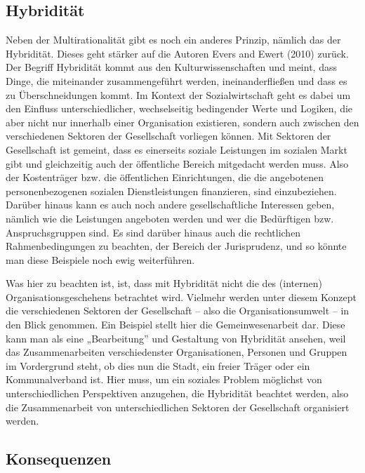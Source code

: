 \documentclass[
  letterpaper,
]{book}
\begin{document}
\subsection{Hybridität}\label{sozialwirtschat-hybriditaet}

Neben der Multirationalität gibt es noch ein anderes Prinzip, nämlich
das der Hybridität. Dieses geht stärker auf die Autoren Evers and Ewert
(2010) zurück. Der Begriff Hybridität kommt aus den Kulturwissenschaften
und meint, dass Dinge, die miteinander zusammengeführt werden,
ineinanderfließen und dass es zu Überschneidungen kommt. Im Kontext der
Sozialwirtschaft geht es dabei um den Einfluss unterschiedlicher,
wechselseitig bedingender Werte und Logiken, die aber nicht nur
innerhalb einer Organisation existieren, sondern auch zwischen den
verschiedenen Sektoren der Gesellschaft vorliegen können. Mit Sektoren
der Gesellschaft ist gemeint, dass es einerseits soziale Leistungen im
sozialen Markt gibt und gleichzeitig auch der öffentliche Bereich
mitgedacht werden muss. Also der Kostenträger bzw. die öffentlichen
Einrichtungen, die die angebotenen personenbezogenen sozialen
Dienstleistungen finanzieren, sind einzubeziehen. Darüber hinaus kann es
auch noch andere gesellschaftliche Interessen geben, nämlich wie die
Leistungen angeboten werden und wer die Bedürftigen bzw.
Anspruchsgruppen sind. Es sind darüber hinaus auch die rechtlichen
Rahmenbedingungen zu beachten, der Bereich der Jurisprudenz, und so
könnte man diese Beispiele noch ewig weiterführen.

Was hier zu beachten ist, ist, dass mit Hybridität nicht die des
(internen) Organisationsgeschehens betrachtet wird. Vielmehr werden
unter diesem Konzept die verschiedenen Sektoren der Gesellschaft -- also
die Organisationsumwelt -- in den Blick genommen. Ein Beispiel stellt
hier die Gemeinwesenarbeit dar. Diese kann man als eine „Bearbeitung''
und Gestaltung von Hybridität ansehen, weil das Zusammenarbeiten
verschiedenster Organisationen, Personen und Gruppen im Vordergrund
steht, ob dies nun die Stadt, ein freier Träger oder ein Kommunalverband
ist. Hier muss, um ein soziales Problem möglichst von unterschiedlichen
Perspektiven anzugehen, die Hybridität beachtet werden, also die
Zusammenarbeit von unterschiedlichen Sektoren der Gesellschaft
organisiert werden.

\subsection{Konsequenzen}\label{sozialwirtschat-konsequenzen}
\end{document}

